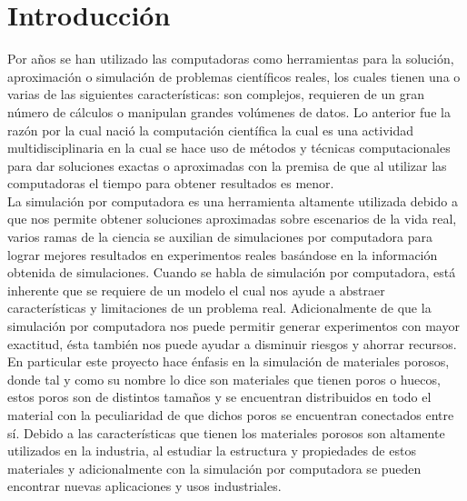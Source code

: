 \chapter{Introducción}
\label{champ:intro}
\bigskip
\barra
\bigskip


Por años se han utilizado las computadoras como herramientas para la solución, aproximación o simulación de problemas científicos reales, los cuales tienen una o varias de las siguientes características: son complejos, requieren de un gran número de cálculos o manipulan grandes volúmenes de datos. Lo anterior fue la razón por la cual nació la computación científica la cual es una actividad multidisciplinaria en la cual se hace uso de métodos y técnicas computacionales para dar soluciones exactas o aproximadas con la premisa de que al utilizar las computadoras el tiempo para obtener resultados es menor. \\

La simulación por computadora es una herramienta altamente utilizada debido a que nos permite obtener soluciones aproximadas sobre escenarios de la vida real, varios ramas de la ciencia se auxilian de simulaciones por computadora para lograr mejores resultados en experimentos reales basándose en la información obtenida de simulaciones. Cuando se habla de simulación por computadora, est\'a inherente que se requiere de un modelo el cual nos ayude a abstraer características y limitaciones de un problema real. Adicionalmente de que la simulación por computadora nos puede permitir generar experimentos con mayor exactitud, \'esta también nos puede ayudar a disminuir riesgos y ahorrar recursos.\\

En particular este proyecto hace énfasis en la simulación de materiales porosos, donde tal y como su nombre lo dice son materiales que tienen poros o huecos, estos poros son de distintos tamaños y se encuentran distribuidos en todo el material con la peculiaridad de que dichos poros se encuentran conectados entre s\'i. Debido a las características que tienen los materiales porosos son altamente utilizados en la industria, al estudiar la estructura y propiedades de estos materiales y adicionalmente con la simulación por computadora se pueden encontrar nuevas aplicaciones y usos industriales.\\

